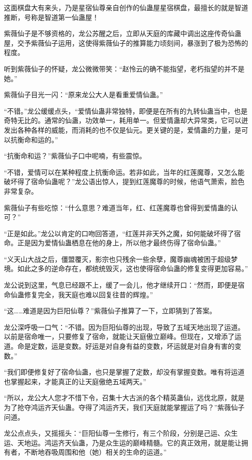 \begin{this_body}
这面棋盘大有来头，乃是星宿仙尊亲自创作的仙蛊屋星宿棋盘，最擅长的就是智道推断，号称是智道第一仙蛊屋！

紫薇仙子是不够资格的，龙公苏醒之后，立即从天庭的库藏中调出这座传奇仙蛊屋，交予紫薇仙子运用，这使得紫薇仙子的推算能力顷刻间，暴涨到了极为恐怖的程度。

听到紫薇仙子的怀疑，龙公微微带笑：“赵怜云的确不能指望，老朽指望的并不是她。”

紫薇仙子目光一闪：“原来龙公大人是看重爱情仙蛊。”

“不错。”龙公缓缓点头，“爱情仙蛊非常独特，即便是在所有的九转仙蛊当中，也是奇特无比的。通常的仙蛊，功效单一，耗用单一。但爱情蛊却大异常类，它可以迸发出各种各样的威能，而消耗的也不仅是仙元。更关键的是，爱情蛊的力量，是可以抗衡命和运的。”

“抗衡命和运？”紫薇仙子口中呢喃，有些震惊。

“不错，爱情可以在某种程度上抗衡命运。若非如此，当年的红莲魔尊，又怎么能破坏得了宿命仙蛊呢？”龙公语出惊人，提到红莲魔尊的时候，他语气萧索，脸色非常复杂。

紫薇仙子有些吃惊：“什么意思？难道当年，红、红莲魔尊也曾得到爱情蛊的认可？”

“正是如此。”龙公以肯定的口吻回答道，“红莲并非天外之魔，如何能破坏得了宿命。正是因为爱情仙蛊栖息在他的身上，所以他才最终伤得了宿命仙蛊。”

“义天山大战之后，僵盟覆灭，影宗也只残余一些余孽，魔尊幽魂被困于超级梦境。如此之多的逆命存在，都统统毁灭，这也使得宿命仙蛊的修复变得更加容易。”

龙公说到这里，气息已经跟不上，缓了一会儿，他才继续开口：“然而，即便是宿命仙蛊修复完全，我天庭也难以回复往昔的辉煌。”

“这……难道是因为巨阳仙尊？”紫薇仙子推算了一下，立即猜到了答案。

龙公深呼吸一口气：“不错。因为巨阳仙尊的出现，导致了五域天地出现了运道。以前是宿命唯一，只要修复了宿命，就能让天庭傲立巅峰。但现在，又增添了运道。命是定数，运是变数。好运是对自身有益的变数，坏运就是对自身有害的变数。”

“我们即便修复好了宿命仙蛊，也只是掌握了定数，却没有掌握变数。唯有将运道也掌握起来，才能真正的让天庭傲绝五域两天。”

“所以，龙公大人您才不惜下令，召集十大古派的各个精英蛊仙，远伐北原，就是为了抢夺鸿运齐天仙蛊。夺得了鸿运齐天，我们天庭就能掌握运了吗？”紫薇仙子问道。

龙公点点头，又摇摇头：“巨阳仙尊一生修行，有三个阶段，分别是己运、众生运、天地运。鸿运齐天仙蛊，乃是众生运的巅峰精髓。它的真正效用，就是能让拥有者，不断地吞吸周围和他（她）相关的生命的运道。”


\end{this_body}
